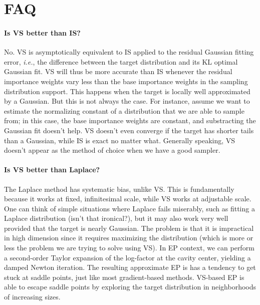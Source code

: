\documentclass{article}
\begin{document}
\section{FAQ}

\paragraph{Is VS better than IS?} No. VS is asymptotically equivalent to IS applied to the residual Gaussian fitting error, {\em i.e.}, the difference between the target distribution and its KL optimal Gaussian fit. VS will thus be more accurate than IS whenever the residual importance weights vary less than the base importance weights in the sampling distribution support. This happens when the target is locally well approximated by a Gaussian. But this is not always the case. For instance, assume we want to estimate the normalizing constant of a distribution that we are able to sample from; in this case, the base importance weights are constant, and substracting the Gaussian fit doesn't help. VS doesn't even converge if the target has shorter tails than a Gaussian, while IS is exact no matter what. Generally speaking, VS doesn't appear as the method of choice when we have a good sampler.


\paragraph{Is VS better than Laplace?} The Laplace method has systematic bias, unlike VS. This is fundamentally because it works at fixed, infinitesimal scale, while VS works at adjustable scale. One can think of simple situations where Laplace fails miserably, such as fitting a Laplace distribution (isn't that ironical?), but it may also work very well provided that the target is nearly Gaussian. The problem is that it is impractical in high dimension since it requires maximizing the distribution (which is more or less the problem we are trying to solve using VS). In EP context, we can perform a second-order Taylor expansion of the log-factor at the cavity center, yielding a damped Newton iteration. The resulting approximate EP is has a tendency to get stuck at saddle points, just like most gradient-based methods. VS-based EP is able to escape saddle points by exploring the target distribution in neighborhoods of increasing sizes. 
\end{document}
